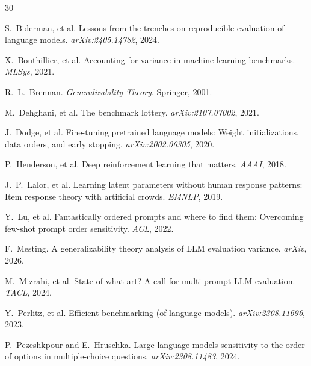 \documentclass[11pt,twocolumn]{article}
\begin{document}
{\small

\begin{thebibliography}{30}

S.~Biderman, et al.
\newblock Lessons from the trenches on reproducible evaluation of language models.
\newblock \emph{arXiv:2405.14782}, 2024.

X.~Bouthillier, et al.
\newblock Accounting for variance in machine learning benchmarks.
\newblock \emph{MLSys}, 2021.

R.~L.~Brennan.
\newblock \emph{Generalizability Theory}.
\newblock Springer, 2001.

M.~Dehghani, et al.
\newblock The benchmark lottery.
\newblock \emph{arXiv:2107.07002}, 2021.

J.~Dodge, et al.
\newblock Fine-tuning pretrained language models: Weight initializations, data orders, and early stopping.
\newblock \emph{arXiv:2002.06305}, 2020.

P.~Henderson, et al.
\newblock Deep reinforcement learning that matters.
\newblock \emph{AAAI}, 2018.

J.~P.~Lalor, et al.
\newblock Learning latent parameters without human response patterns: Item response theory with artificial crowds.
\newblock \emph{EMNLP}, 2019.

Y.~Lu, et al.
\newblock Fantastically ordered prompts and where to find them: Overcoming few-shot prompt order sensitivity.
\newblock \emph{ACL}, 2022.

F.~Mesting.
\newblock A generalizability theory analysis of LLM evaluation variance.
\newblock \emph{arXiv}, 2026.

M.~Mizrahi, et al.
\newblock State of what art? A call for multi-prompt LLM evaluation.
\newblock \emph{TACL}, 2024.

Y.~Perlitz, et al.
\newblock Efficient benchmarking (of language models).
\newblock \emph{arXiv:2308.11696}, 2023.

P.~Pezeshkpour and E.~Hruschka.
\newblock Large language models sensitivity to the order of options in multiple-choice questions.
\newblock \emph{arXiv:2308.11483}, 2024.


\end{thebibliography}}
\end{document}
